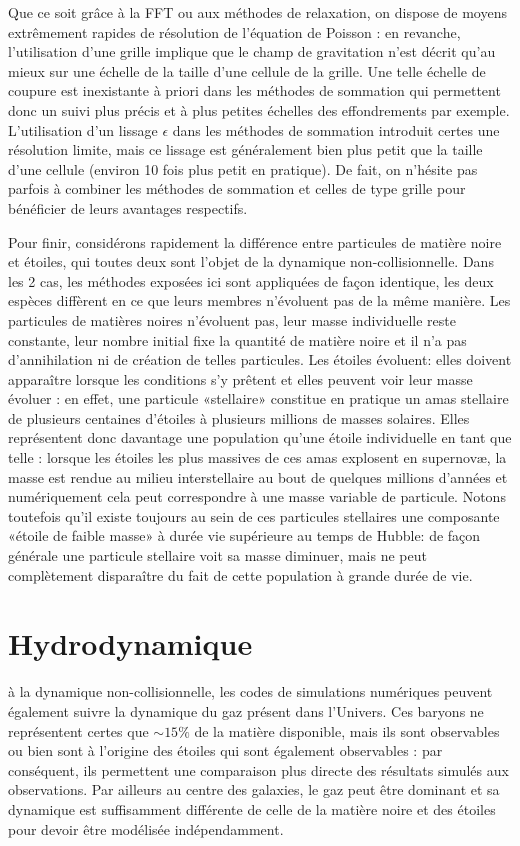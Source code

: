 Que ce soit grâce à la FFT ou aux méthodes de relaxation, on dispose de moyens extrêmement rapides de résolution de l'équation de Poisson : en revanche, l'utilisation d'une grille implique que le champ de gravitation n'est décrit qu'au mieux sur une échelle de la taille d'une cellule de la grille. Une telle échelle de coupure est inexistante à priori dans les méthodes de sommation qui permettent donc un suivi plus précis et à plus petites échelles des effondrements par exemple. L’utilisation d'un lissage $\epsilon$ dans les méthodes de sommation introduit certes une résolution limite, mais ce lissage est généralement bien plus petit que la taille d'une cellule (environ 10 fois plus petit en pratique). De fait, on n'hésite pas parfois à combiner les méthodes de sommation et celles de type grille pour bénéficier de leurs avantages respectifs.

Pour finir, considérons rapidement la différence entre particules de matière noire et étoiles, qui toutes deux sont l'objet de la dynamique non-collisionnelle. Dans les 2 cas, les méthodes exposées ici sont appliquées de façon identique, les deux espèces diffèrent en ce que leurs membres n'évoluent pas de la même manière. Les particules de matières noires n'évoluent pas, leur masse individuelle reste constante, leur nombre initial fixe la quantité de matière noire et il n'a pas d'annihilation ni de création de telles particules. Les étoiles évoluent: elles doivent apparaître lorsque les conditions s'y prêtent et elles peuvent voir leur masse évoluer : en effet, une particule «stellaire» constitue en pratique un amas stellaire  de plusieurs centaines d'étoiles à plusieurs millions de masses solaires. Elles représentent donc davantage une population qu'une étoile individuelle en tant que telle : lorsque les étoiles les plus massives de ces amas explosent en supernovæ, la masse est rendue au milieu interstellaire au bout de quelques millions d'années et numériquement cela peut correspondre à une masse variable de particule. Notons toutefois qu'il existe toujours au sein de ces particules stellaires une composante «étoile de faible masse» à durée vie supérieure au temps de Hubble: de façon générale une particule stellaire voit sa masse diminuer, mais ne peut complètement disparaître du fait de cette population à grande durée de vie.

\section{Hydrodynamique}
 à la dynamique non-collisionnelle, les codes de simulations numériques peuvent également suivre la dynamique du gaz présent dans l'Univers. Ces baryons ne représentent certes que $\sim 15\%$ de la matière disponible, mais ils sont observables ou bien sont à l'origine des étoiles qui sont également observables : par conséquent, ils permettent une comparaison plus directe des résultats simulés aux observations. Par ailleurs au centre des galaxies, le gaz peut être dominant et sa dynamique est suffisamment différente de celle de la matière noire et des étoiles pour devoir être modélisée indépendamment.

